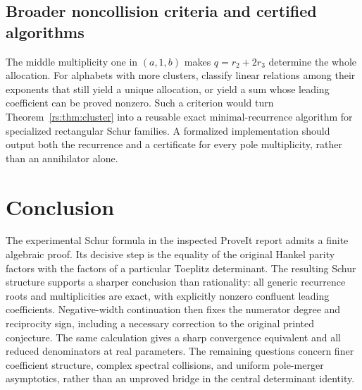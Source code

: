 \documentclass[11pt]{article}
\theoremstyle{definition}
\theoremstyle{remark}
\theoremstyle{definition}
\theoremstyle{plain}
\numberwithin{equation}{section}
\begin{document}
\subsection{Broader noncollision criteria and certified algorithms}
\label{cp:sec:rs-noncollision}
The middle multiplicity one in $(a,1,b)$ makes
$q=r_2+2r_3$ determine the whole allocation. For alphabets with more clusters,
classify linear relations among their exponents that still yield a unique
allocation, or yield a sum whose leading coefficient can be proved nonzero.
Such a criterion would turn Theorem~\ref{rs:thm:cluster} into a reusable exact
minimal-recurrence algorithm for specialized rectangular Schur families.
A formalized implementation should output both the recurrence and a
certificate for every pole multiplicity, rather than an annihilator alone.


\section{Conclusion}
The experimental Schur formula in the inspected ProveIt report admits a
finite algebraic proof. Its decisive step is the equality of the original
Hankel parity factors with the factors of a particular Toeplitz determinant.
The resulting Schur structure supports a sharper conclusion than rationality:
all generic recurrence roots and multiplicities are exact, with explicitly
nonzero confluent leading coefficients. Negative-width continuation then
fixes the numerator degree and reciprocity sign, including a necessary
correction to the original printed conjecture. The same calculation gives
a sharp convergence equivalent and all reduced denominators at real
parameters. The remaining questions concern finer coefficient structure,
complex spectral collisions, and uniform pole-merger asymptotics, rather
than an unproved bridge in the central determinant identity.

\end{document}
